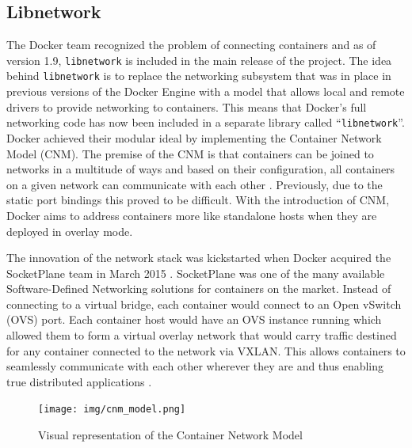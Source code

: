 \subsection{Libnetwork}
The Docker team recognized the problem of connecting containers and as of version 1.9, \texttt{libnetwork} is included in the main release of the project. The idea behind \texttt{libnetwork} is to replace the networking subsystem that was in place in previous versions of the Docker Engine with a model that allows local and remote drivers to provide networking to containers. This means that Docker’s full networking code has now been included in a separate library called “\texttt{libnetwork}”. Docker achieved their modular ideal by implementing the Container Network Model (CNM). The premise of the CNM is that containers can be joined to networks in a multitude of ways and based on their configuration, all containers on a given network can communicate with each other \cite{5_bridgen_2015}. Previously, due to the static port bindings this proved to be difficult. With the introduction of CNM, Docker aims to address containers more like standalone hosts when they are deployed in overlay mode.

The innovation of the network stack was kickstarted when Docker acquired the SocketPlane team in March 2015 \cite{socketplane2015}. SocketPlane was one of the many available Software-Defined Networking solutions for containers on the market. Instead of connecting to a virtual bridge, each container would connect to an Open vSwitch (OVS) port. Each container host would have an OVS instance running which allowed them to form a virtual overlay network that would carry traffic destined for any container connected to the network via VXLAN. This allows containers to seamlessly communicate with each other wherever they are and thus enabling true distributed applications \cite{multihost2015}. 

\begin{figure}[!ht]
   \centering
   \texttt{[image: img/cnm\_model.png]}
   \caption{Visual representation of the Container Network Model \cite{GITHUB}}
   \label{fig:cnm_model}
\end{figure}

